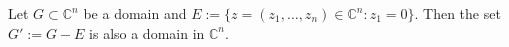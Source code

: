 Let $G \subset \mathbb{C}^n$ be a domain and $E := \{ z = (z_1, \ldots, z_n) \in \mathbb{C}^n : z_1 = 0 \}$. Then the set $G' := G - E$ is also a domain in $\mathbb{C}^n$.
